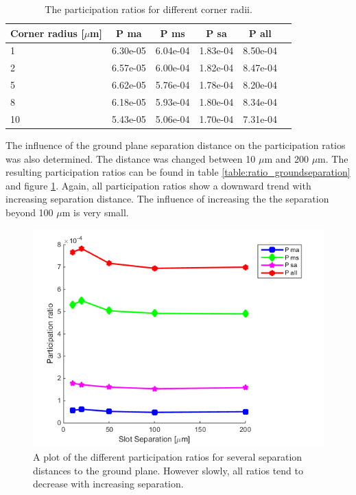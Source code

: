 \begin{table}
	\begin{center}
		\begin{tabular}{ | l || c | c | c | c | c |}
			\hline
			Corner radius [\(\mu\)m] & P ma & P ms & P sa & P all \\ \hline
			1 & 6.30e-05 & 6.04e-04 & 1.83e-04 & 8.50e-04 \\
			2 & 6.57e-05 & 6.00e-04 & 1.82e-04 & 8.47e-04 \\
			5 & 6.62e-05 & 5.76e-04 & 1.78e-04 & 8.20e-04\\
			8 & 6.18e-05 & 5.93e-04 & 1.80e-04 & 8.34e-04\\
			10 & 5.43e-05 & 5.06e-04 & 1.70e-04 & 7.31e-04\\
			\hline
		\end{tabular}
	\end{center}
	\caption{The participation ratios for different corner radii.}
	\label{table:ratio_cornerradius}
\end{table}

The influence of the ground plane separation distance on the participation ratios was also determined. The distance was changed between 10 \(\mu\)m and 200 \(\mu\)m. The resulting participation ratios can be found in table \ref{table:ratio_groundseparation} and figure \ref{fig:SlotSize_legend}. Again, all participation ratios show a downward trend with increasing separation distance. The influence of increasing the the separation beyond 100 \(\mu\)m is very small.

 \begin{figure}
 	\centering
 	\includegraphics[scale = 0.7]{Figures/Ratio_plots/SlotSize_legend}
 	\caption{A plot of the different participation ratios for several separation distances to the ground plane. However slowly, all ratios tend to decrease with increasing separation.}
 	\label{fig:SlotSize_legend}
 \end{figure}

